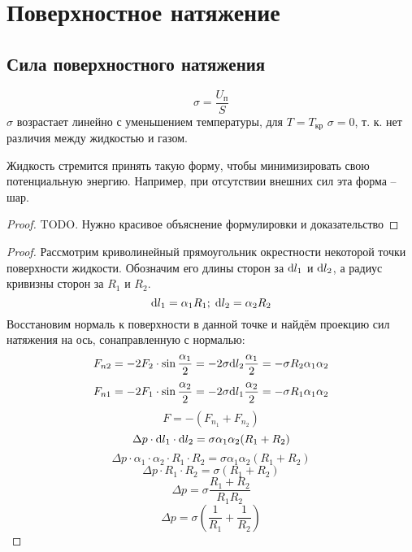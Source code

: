 \section{Поверхностное натяжение}


\subsection{Сила поверхностного натяжения}
\[ \sigma = \frac{U_\text{п}}{S} \]
$\sigma$ возрастает линейно с уменьшением температуры, для $T = T_\text{кр}$ $\sigma = 0$, т. к. нет различия между жидкостью и газом.\par
Жидкость стремится принять такую форму, чтобы минимизировать свою потенциальную энергию. Например, при отсутствии внешних сил эта форма -- шар.\par
{}

\begin{proof}
	TODO. Нужно красивое объяснение формулировки и доказательство
\end{proof}

\begin{proof}
	Рассмотрим криволинейный прямоугольник окрестности некоторой точки поверхности жидкости. Обозначим его длины сторон за $\text{d} l_1$ и $\text{d} l_2$, а радиус кривизны сторон за $R_1$ и $R_2$.
	\[\text{d} l_1 = \alpha_1 R_1;\;\text{d} l_2 = \alpha_2 R_2\]
	Восстановим нормаль к поверхности в данной точке и найдём проекцию сил натяжения на ось, сонаправленную с нормалью:
	\[ F_{n2} = -2 F_2 \cdot \sin{\frac{\alpha_1}{2}} = - 2 \sigma \text{d} l_2 \frac{\alpha_1}{2} = -\sigma R_2 \alpha_1 \alpha_2 \]
	\[ F_{n1} = -2 F_1 \cdot \sin{\frac{\alpha_2}{2}} = - 2 \sigma \text{d} l_1 \frac{\alpha_2}{2} = -\sigma R_1 \alpha_1 \alpha_2 \]
	\[ F = -(F_{n_1} + F_{n_2}) \]
	\[ \Delta p \cdot \text{d} l_1 \cdot \text{d} l_2 = \sigma \alpha_1 \alpha_2 (R_1 + R_2) \]
	\[ \Delta p \cdot \alpha_1 \cdot \alpha_2 \cdot R_1 \cdot R_2 = \sigma \alpha_1 \alpha_2 (R_1 + R_2) \]
	\[ \Delta p \cdot R_1 \cdot R_2 = \sigma (R_1 + R_2) \]
	\[ \Delta p = \sigma \frac{R_1 + R_2}{R_1 R_2} \]
	\[ \Delta p = \sigma (\frac{1}{R_1} + \frac{1}{R_2}) \]
\end{proof}



